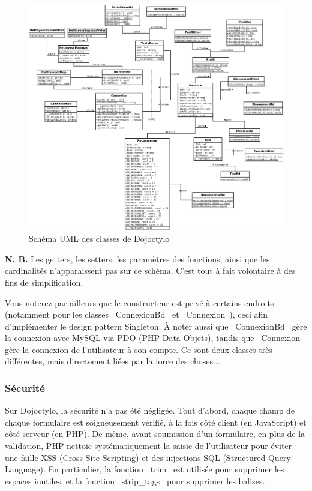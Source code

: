 \documentclass[a4paper,12pt]{article}
\begin{document}
\begin{figure}[!h]
\begin{center}
\includegraphics[scale=0.3]{poo.png}
\end{center}
\caption{Schéma UML des classes de Dojoctylo}
\end{figure}

\textbf{N. B.} Les getters, les setters, les paramètres des fonctions, ainsi que les cardinalités n'apparaissent pas sur ce schéma. C'est tout à fait volontaire à des fins de simplification.

Vous noterez par ailleurs que le constructeur est privé à certains endroits (notamment pour les classes \og~ConnexionBd~\fg{} et \og~Connexion~\fg), ceci afin d'implémenter le design pattern Singleton. À noter aussi que \og~ConnexionBd~\fg{} gère la connexion avec MySQL via PDO (PHP Data Objets), tandis que \og~Connexion~\fg{} gère la connexion de l'utilisateur à son compte. Ce sont deux classes très différentes, mais directement liées par la force des choses...

\subsubsection{Sécurité}

Sur Dojoctylo, la sécurité n'a pas été négligée. Tout d'abord, chaque champ de chaque formulaire est soigneusement vérifié, à la fois côté client (en JavaScript) et côté serveur (en PHP). De même, avant soumission d'un formulaire, en plus de la validation, PHP nettoie systématiquement la saisie de l'utilisateur pour éviter une faille XSS (Cross-Site Scripting) et des injections SQL (Structured Query Language). En particulier, la fonction \og~trim~\fg{} est utilisée pour supprimer les espaces inutiles, et la fonction \og~strip\_tags~\fg{} pour supprimer les balises.
\end{document}
